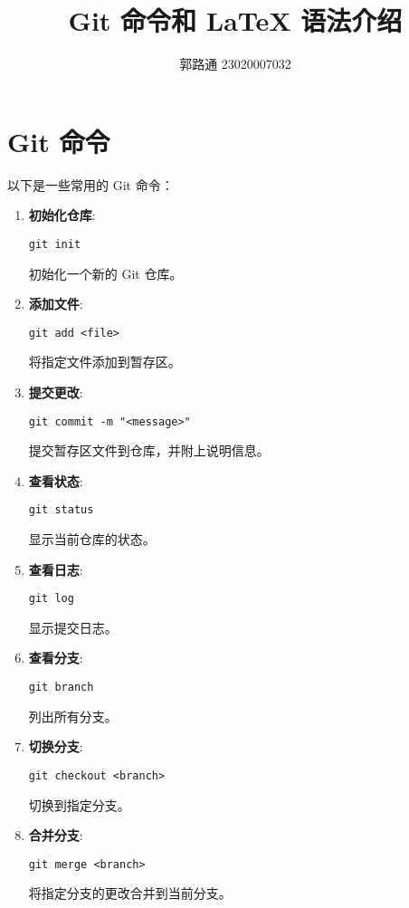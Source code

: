 \documentclass{ctexart}
\begin{document}
\title{Git 命令和 LaTeX 语法介绍}
\author{郭路通  23020007032}
\date{}
\maketitle

\section{Git 命令}
以下是一些常用的 Git 命令：

\begin{enumerate}[label=\arabic*.]
\item \textbf{初始化仓库}:
\begin{lstlisting}
git init
\end{lstlisting}
初始化一个新的 Git 仓库。

\item \textbf{添加文件}:
\begin{lstlisting}
git add <file>
\end{lstlisting}
将指定文件添加到暂存区。

\item \textbf{提交更改}:
\begin{lstlisting}
git commit -m "<message>"
\end{lstlisting}
提交暂存区文件到仓库，并附上说明信息。

\item \textbf{查看状态}:
\begin{lstlisting}
git status
\end{lstlisting}
显示当前仓库的状态。

\item \textbf{查看日志}:
\begin{lstlisting}
git log
\end{lstlisting}
显示提交日志。

\item \textbf{查看分支}:
\begin{lstlisting}
git branch
\end{lstlisting}
列出所有分支。

\item \textbf{切换分支}:
\begin{lstlisting}
git checkout <branch>
\end{lstlisting}
切换到指定分支。

\item \textbf{合并分支}:
\begin{lstlisting}
git merge <branch>
\end{lstlisting}
将指定分支的更改合并到当前分支。


\end{enumerate}
\end{document}
